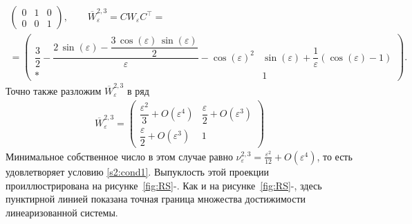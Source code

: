\documentclass[../main.tex]{subfiles}
\begin{document}
\begin{enumerate}
\begin{gather*}
\begin{pmatrix}
                0 & 1 & 0 \\
                0 & 0 & 1
            \end{pmatrix}, \qquad
            \overline{W}_{\varepsilon}^{2,3} =  C W_{\varepsilon} C^{\top}  =\\=\begin{pmatrix}
                \dfrac{3}{2}-\dfrac{2\,\sin\left(\varepsilon \right)-\dfrac{3\,\cos\left(\varepsilon \right)\,\sin\left(\varepsilon \right)}{2}}{\varepsilon }-{\cos\left(\varepsilon \right)}^2 & \sin\left(\varepsilon \right)+\dfrac{1}{\varepsilon } \left(\cos\left(\varepsilon \right)-1 \right)\\[8pt]
                * & 
                1 
            \end{pmatrix}.
        \end{gather*}
        Точно также разложим $ \overline{W}_{\varepsilon}^{2,3} $ в ряд
        \begin{gather*}
            \overline{W}_{\varepsilon}^{2,3}  = \begin{pmatrix}
                \dfrac{\varepsilon^2}{3} + O(\varepsilon^4) &
                \dfrac{\varepsilon }{2} + O(\varepsilon^3) \\[8pt]
                \dfrac{\varepsilon }{2} + O(\varepsilon^3) & 1
            \end{pmatrix}
        \end{gather*}
        Минимальное собственное число в этом случае равно $ \nu^{2,3}_{\varepsilon} = \frac{\varepsilon^2}{12} + O(\varepsilon^4) $, то есть удовлетворяет условию \eqref{s2:cond1}. 
Выпуклость этой проекции проиллюстрирована на рисунке~\ref{fig:RS}-. 
Как и на рисунке~\ref{fig:RS}-, здесь пунктирной линией показана точная граница множества достижимости линеаризованной системы.
    \end{enumerate}
\end{document}
